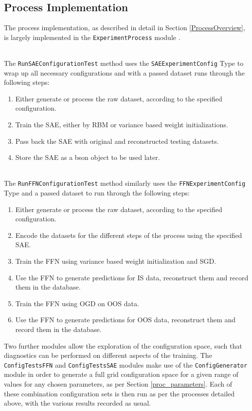 \documentclass[a4paper,11pt,oneside]{article}
\theoremstyle{plain}
\theoremstyle{definition}
\begin{document}
	\subsection{Process Implementation}
	
	The process implementation, as described in detail in Section \ref{ProcessOverview}, is largely implemented in the \texttt{ExperimentProcess} module \citep{DCExperimentProcess}.
	
	~\\
	The \texttt{RunSAEConfigurationTest} method uses the \texttt{SAEExperimentConfig} Type to wrap up all necessary configurations and with a passed dataset runs through the following steps:
	\begin{enumerate}
		\item Either generate or process the raw dataset, according to the specified configuration.
		\item Train the SAE, either by RBM or variance based weight initializations.
		\item Pass back the SAE with original and reconstructed testing datasets.
		\item Store the SAE as a bson object to be used later.
	\end{enumerate}
	
	~\\
	The \texttt{RunFFNConfigurationTest} method similarly uses the \texttt{FFNExperimentConfig} Type and a passed dataset to run through the following steps:
	\begin{enumerate}
		\item Either generate or process the raw dataset, according to the specified configuration.
		\item Encode the datasets for the different steps of the process using the specified SAE.
		\item Train the FFN using variance based weight initialization and SGD.
		\item Use the FFN to generate predictions for IS data, reconstruct them and record them in the database.
		\item Train the FFN using OGD on OOS data.
		\item Use the FFN to generate predictions for OOS data, reconstruct them and record them in the database.
	\end{enumerate}
	
	Two further modules allow the exploration of the configuration space, such that diagnostics can be performed on different aspects of the training. 	The \texttt{ConfigTestsFFN} \citep{DCConfigTestsFFN} and \texttt{ConfigTestsSAE} \citep{DCConfigTestsSAE} modules make use of the \texttt{ConfigGenerator} module \citep{DCGenerator} in order to generate a full grid configuration space for a given range of values for any chosen parameters, as per Section \ref{proc_parameters}. Each of these combination configuration sets is then run as per the processes detailed above, with the various results recorded as usual. 
\end{document}
